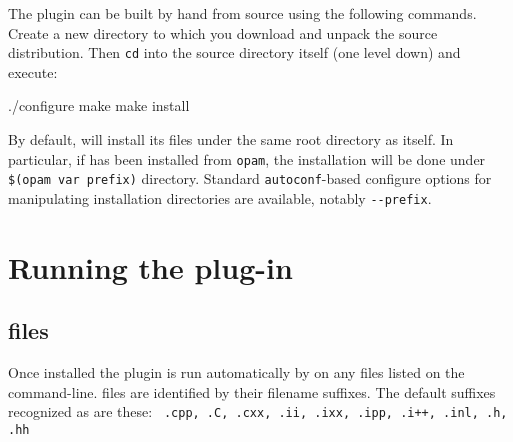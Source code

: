The plugin can be built by hand from source using the following commands. Create a new directory to which you download and unpack the source distribution. Then \lstinline|cd| into the source directory itself (one level down) and execute:
\begin{listing-nonumber}
./configure
make
make install
\end{listing-nonumber}

By default, \fclang will install its files under the same root
directory as \framac itself. In particular, if \framac has been
installed from \lstinline|opam|, the installation will be done under
\verb|$(opam var prefix)| directory. Standard \lstinline|autoconf|-based
configure options for manipulating installation directories are available,
notably \verb|--prefix|.

%
%
%
%
%
%
%
%
%

\chapter{Running the plug-in}

\section{\cpp files}
Once installed the plugin is run automatically by \framac on any \cpp
files listed on the command-line. \cpp files are identified by their
filename suffixes. The default suffixes recognized as \cpp are these:
\lstinline| .cpp, .C, .cxx, .ii, .ixx, .ipp, .i++, .inl, .h, .hh|

